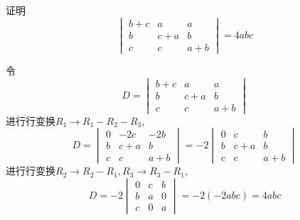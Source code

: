 \begin{questions}
    \question 证明
    \[
    \begin{vmatrix} 
    b+c & a & a \\ 
    b & c+a & b \\ 
    c & c & a+b 
    \end{vmatrix} = 4abc
    \]
    \begin{solution}
        令
        \[
        D=\begin{vmatrix} 
        b+c & a & a \\ 
        b & c+a & b \\ 
        c & c & a+b 
        \end{vmatrix}
        \]
        进行行变换$R_1 \to R_1 - R_2 - R_3$,
        \[
        D=\begin{vmatrix} 
        0 & -2c & -2b \\ 
        b & c+a & b \\ 
        c & c & a+b 
        \end{vmatrix}
        =-2 \begin{vmatrix} 
        0 & c & b \\ 
        b & c+a & b \\ 
        c & c & a+b 
        \end{vmatrix}
        \]
        进行行变换$R_2 \to R_2 - R_1,R_3 \to R_3 - R_1$,
        \[
        D = -2 \begin{vmatrix} 
        0 & c & b \\ 
        b & a & 0 \\ 
        c & 0 & a 
        \end{vmatrix} = -2 (-2abc) = 4abc
        \]
    \end{solution}


\end{questions}

